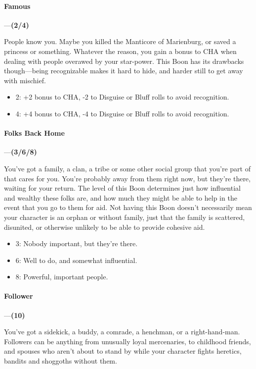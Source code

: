 \documentclass[oneside,11pt,english]{book}
\begin{document}
\paragraph{\label{boon:Famous}Famous}---\quad\textbf{(2/4)}\par
People know you. Maybe you killed the Manticore of Marienburg, or saved a princess or something. 
Whatever the reason, you gain a bonus to CHA when dealing with people overawed by your star-power. 
This Boon has its drawbacks though—being recognizable makes it hard to hide, and harder still to get 
away with mischief.
	\begin{itemize}
		\item 2: +2 bonus to CHA, -2 to Disguise or Bluff rolls to avoid recognition. 
		\item 4: +4 bonus to CHA, -4 to Disguise or Bluff rolls to avoid recognition. 
	\end{itemize}
\paragraph{\label{boon:Folks Back Home}Folks Back Home}---\quad\textbf{(3/6/8)}\par
You've got a family, a clan, a tribe or some other social group that you're part of that cares for you. You're 
probably away from them right now, but they're there, waiting for your return. The level of this Boon 
determines just how influential and wealthy these folks are, and how much they might be able to help in 
the event that you go to them for aid. Not having this Boon doesn't necessarily mean your character is an 
orphan or without family, just that the family is scattered, disunited, or otherwise unlikely to be able to 
provide cohesive aid. 
	\begin{itemize}
		\item 3: Nobody important, but they’re there. 
		\item 6: Well to do, and somewhat influential. 
		\item 8: Powerful, important people.
	\end{itemize}
\paragraph{\label{boon:Follower}Follower}---\quad\textbf{(10)}\par
You've got a sidekick, a buddy, a comrade, a henchman, or a right-hand-man. Followers can be anything 
from unusually loyal mercenaries, to childhood friends, and spouses who aren't about to stand by while 
your character fights heretics, bandits and shoggoths without them. 
\end{document}
